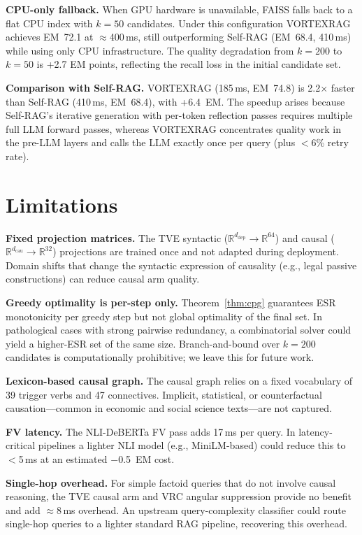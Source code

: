 \documentclass[10pt,twocolumn]{article}
\newcommand{\secvspace}{\vspace{-4pt}}
\newcommand{\R}{\mathbb{R}}
\begin{document}
\noindent\textbf{CPU-only fallback.}
When GPU hardware is unavailable, FAISS falls back to a flat CPU index with
$k=50$ candidates.  Under this configuration VORTEXRAG achieves EM~72.1 at
$\approx$400\,ms, still outperforming Self-RAG (EM~68.4, 410\,ms) while using
only CPU infrastructure.  The quality degradation from $k=200$ to $k=50$
is +2.7 EM points, reflecting the recall loss in the initial candidate set.

\noindent\textbf{Comparison with Self-RAG.}
VORTEXRAG (185\,ms, EM~74.8) is 2.2$\times$ faster than Self-RAG (410\,ms,
EM~68.4), with +6.4~EM.  The speedup arises because Self-RAG's iterative
generation with per-token reflection passes requires multiple full LLM
forward passes, whereas VORTEXRAG concentrates quality work in the pre-LLM
layers and calls the LLM exactly once per query (plus $<$6\% retry rate).

\section{Limitations}\label{sec:limits}
\secvspace

\noindent\textbf{Fixed projection matrices.}
The TVE syntactic ($\R^{d_\text{dep}}\to\R^{64}$) and causal
($\R^{d_\text{cau}}\to\R^{32}$) projections are trained once and not adapted
during deployment.  Domain shifts that change the syntactic expression of
causality (e.g., legal passive constructions) can reduce causal arm quality.

\noindent\textbf{Greedy optimality is per-step only.}
Theorem~\ref{thm:cpg} guarantees ESR monotonicity per greedy step but not
global optimality of the final set.  In pathological cases with strong
pairwise redundancy, a combinatorial solver could yield a higher-ESR set
of the same size.  Branch-and-bound over $k=200$ candidates is computationally
prohibitive; we leave this for future work.

\noindent\textbf{Lexicon-based causal graph.}
The causal graph relies on a fixed vocabulary of 39 trigger verbs and 47
connectives.  Implicit, statistical, or counterfactual causation---common in
economic and social science texts---are not captured.

\noindent\textbf{FV latency.}
The NLI-DeBERTa FV pass adds 17\,ms per query.  In latency-critical pipelines
a lighter NLI model (e.g., MiniLM-based) could reduce this to $<$5\,ms at
an estimated $-$0.5~EM cost.

\noindent\textbf{Single-hop overhead.}
For simple factoid queries that do not involve causal reasoning, the TVE causal
arm and VRC angular suppression provide no benefit and add $\approx$8\,ms
overhead.  An upstream query-complexity classifier could route single-hop
queries to a lighter standard RAG pipeline, recovering this overhead.
\end{document}
